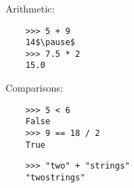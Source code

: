 \documentclass[notes]{beamer}
\begin{document}
\begin{frame}[fragile]
\begin{itemize}
		
		
	\end{itemize}
\end{frame}

\begin{frame}[fragile]
	\frametitle{}
	
	Arithmetic:
	
	\begin{lstlisting}
	>>> 5 + 9
	14$\pause$
	>>> 7.5 * 2
	15.0
	\end{lstlisting}
	
	\pause
	
	Comparisons:
	
	\begin{lstlisting}
	>>> 5 < 6
	False
	>>> 9 == 18 / 2
	True
	\end{lstlisting}
	
	\pause

	\begin{lstlisting}
	>>> "two" + "strings"
	"twostrings" 
	\end{lstlisting}
	
\end{frame}
\end{document}
